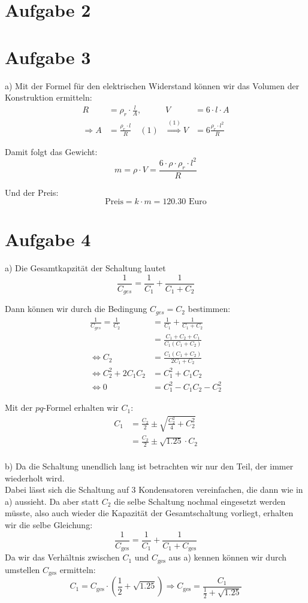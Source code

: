 \documentclass[11pt a4paper]{article}
\begin{document}
\section*{Aufgabe 2}
\section*{Aufgabe 3}

a)
Mit der Formel für den elektrischen Widerstand können wir das Volumen der 
Konstruktion ermitteln:
\begin{align*}
	R &= \rho_r \cdot \frac{l}{A}, & V &= 6 \cdot l \cdot A \\
	\Rightarrow A &= \frac{\rho_r \cdot l}{R} \quad (1)
	& \overset{(1)}{\Rightarrow} V &= 6 \frac{\rho_r \cdot l^2}{R}
\end{align*}

Damit folgt das Gewicht:
\[
	m = \rho \cdot V = \frac{6 \cdot \rho \cdot \rho_r \cdot l^2}{R}
\]

Und der Preis:
\[
	\text{Preis} = k \cdot m = 120.30 \text{ Euro}
\]

\section*{Aufgabe 4}
a)
Die Gesamtkapzität der Schaltung lautet
\[
	\frac{1}{C_{ges}} = \frac{1}{C_1} + \frac{1}{C_1 + C_2}
\]

Dann können wir durch die Bedingung $C_{ges} = C_2$ bestimmen:
\begin{align*}
	\frac{1}{C_{ges}} = \frac{1}{C_2}
	&= \frac{1}{C_1} + \frac{1}{C_1 + C_2} \\
	&= \frac{C_1 + C_2 + C_1}{C_1 (C_1 + C_2)} \\
	\Leftrightarrow
	C_2 &= \frac{C_1 (C_1 + C_2)}{2C_1 + C_2} \\
	\Leftrightarrow
	C_2^2 + 2C_1C_2 &= C_1^2 + C_1C_2 \\
	\Leftrightarrow
	0 &= C_1^2 - C_1C_2 - C_2^2
\end{align*}

Mit der $pq$-Formel erhalten wir $C_1$:
\begin{align*}
	C_1 &= \frac{C_2}{2} \pm \sqrt{\frac{C_2^2}{4} + C_2^2} \\
	&= \frac{C_2}{2} \pm \sqrt{1.25} \cdot C_2 \\
\end{align*}

b) Da die Schaltung unendlich lang ist betrachten wir nur den Teil, der
immer wiederholt wird.\\
Dabei lässt sich die Schaltung auf 3 Kondensatoren vereinfachen, die dann
wie in a) aussieht. Da aber statt $C_2$ die selbe Schaltung nochmal 
eingesetzt werden müsste, also auch wieder die Kapazität der Gesamtschaltung
vorliegt, erhalten wir die selbe Gleichung:
\[
	\frac1{C_\text{ges}} = \frac{1}{C_1} + \frac{1}{C_1 + C_\text{ges}}
\]
Da wir das Verhältnis zwischen $C_1$ und $C_\text{ges}$ aus a) kennen 
können wir durch umstellen $C_\text{ges}$ ermitteln:
\[
	C_1 = C_\text{ges} \cdot \left( \frac12 + \sqrt{1.25} \right)
	\Rightarrow
	C_\text{ges} = \frac{C_1}{\frac12 + \sqrt{1.25}}
	\]
\end{document}
